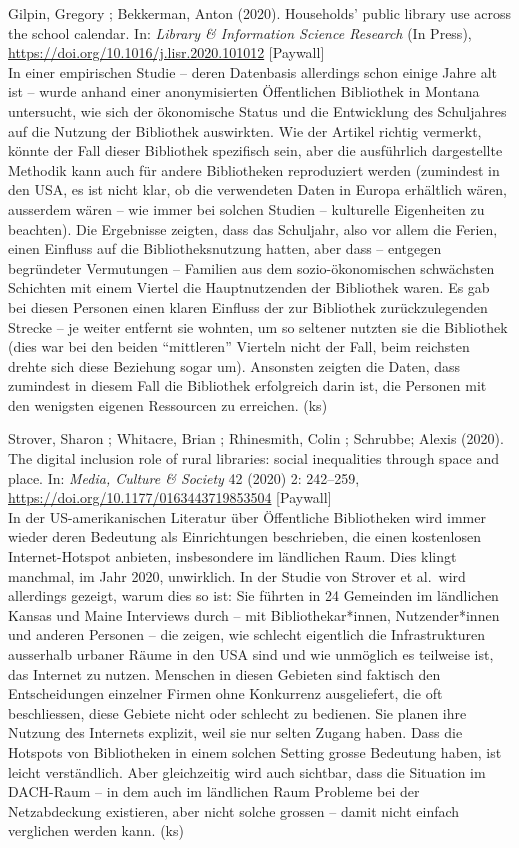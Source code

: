 \documentclass[a4paper,
fontsize=11pt,
oneside,
numbers=noperiodatend,
parskip=half-,
bibliography=totoc,
final
]{scrartcl}
\begin{document}
Gilpin, Gregory ; Bekkerman, Anton (2020). Households' public library
use across the school calendar. In: \emph{Library \& Information Science
Research} (In Press), \url{https://doi.org/10.1016/j.lisr.2020.101012}
{[}Paywall{]}\\
In einer empirischen Studie -- deren Datenbasis allerdings schon einige
Jahre alt ist -- wurde anhand einer anonymisierten Öffentlichen
Bibliothek in Montana untersucht, wie sich der ökonomische Status und
die Entwicklung des Schuljahres auf die Nutzung der Bibliothek
auswirkten. Wie der Artikel richtig vermerkt, könnte der Fall dieser
Bibliothek spezifisch sein, aber die ausführlich dargestellte Methodik
kann auch für andere Bibliotheken reproduziert werden (zumindest in den
USA, es ist nicht klar, ob die verwendeten Daten in Europa erhältlich
wären, ausserdem wären -- wie immer bei solchen Studien -- kulturelle
Eigenheiten zu beachten). Die Ergebnisse zeigten, dass das Schuljahr,
also vor allem die Ferien, einen Einfluss auf die Bibliotheksnutzung
hatten, aber dass -- entgegen begründeter Vermutungen -- Familien aus
dem sozio-ökonomischen schwächsten Schichten mit einem Viertel die
Hauptnutzenden der Bibliothek waren. Es gab bei diesen Personen einen
klaren Einfluss der zur Bibliothek zurückzulegenden Strecke -- je weiter
entfernt sie wohnten, um so seltener nutzten sie die Bibliothek (dies
war bei den beiden ``mittleren'' Vierteln nicht der Fall, beim reichsten
drehte sich diese Beziehung sogar um). Ansonsten zeigten die Daten, dass
zumindest in diesem Fall die Bibliothek erfolgreich darin ist, die
Personen mit den wenigsten eigenen Ressourcen zu erreichen. (ks)

Strover, Sharon ; Whitacre, Brian ; Rhinesmith, Colin ; Schrubbe; Alexis
(2020). The digital inclusion role of rural libraries: social
inequalities through space and place. In: \emph{Media, Culture \&
Society} 42 (2020) 2: 242--259,
\url{https://doi.org/10.1177/0163443719853504} {[}Paywall{]}\\
In der US-amerikanischen Literatur über Öffentliche Bibliotheken wird
immer wieder deren Bedeutung als Einrichtungen beschrieben, die einen
kostenlosen Internet-Hotspot anbieten, insbesondere im ländlichen Raum.
Dies klingt manchmal, im Jahr 2020, unwirklich. In der Studie von
Strover et al.~wird allerdings gezeigt, warum dies so ist: Sie führten
in 24 Gemeinden im ländlichen Kansas und Maine Interviews durch -- mit
Bibliothekar*innen, Nutzender*innen und anderen Personen -- die zeigen,
wie schlecht eigentlich die Infrastrukturen ausserhalb urbaner Räume in
den USA sind und wie unmöglich es teilweise ist, das Internet zu nutzen.
Menschen in diesen Gebieten sind faktisch den Entscheidungen einzelner
Firmen ohne Konkurrenz ausgeliefert, die oft beschliessen, diese Gebiete
nicht oder schlecht zu bedienen. Sie planen ihre Nutzung des Internets
explizit, weil sie nur selten Zugang haben. Dass die Hotspots von
Bibliotheken in einem solchen Setting grosse Bedeutung haben, ist leicht
verständlich. Aber gleichzeitig wird auch sichtbar, dass die Situation
im DACH-Raum -- in dem auch im ländlichen Raum Probleme bei der
Netzabdeckung existieren, aber nicht solche grossen -- damit nicht
einfach verglichen werden kann. (ks)
\end{document}
